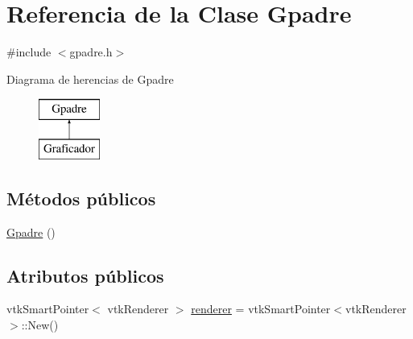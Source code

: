 \hypertarget{class_gpadre}{}\section{Referencia de la Clase Gpadre}
\label{class_gpadre}


{\ttfamily \#include $<$gpadre.\+h$>$}

Diagrama de herencias de Gpadre\begin{figure}[H]
\begin{center}
\leavevmode
\includegraphics[height=2.000000cm]{class_gpadre}
\end{center}
\end{figure}
\subsection*{Métodos públicos}
\begin{DoxyCompactItemize}
\item 
\hyperlink{class_gpadre_a0f32f7f4711cac9c26f68e3facd4cfa6}{Gpadre} ()
\end{DoxyCompactItemize}
\subsection*{Atributos públicos}
\begin{DoxyCompactItemize}
\item 
vtk\+Smart\+Pointer$<$ vtk\+Renderer $>$ \hyperlink{class_gpadre_acb2bafea1132fdda5e023edc5067c673}{renderer} = vtk\+Smart\+Pointer$<$vtk\+Renderer$>$\+::New()
\end{DoxyCompactItemize}
